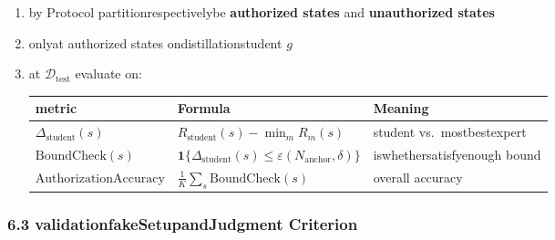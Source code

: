 \documentclass[
  12pt,
]{article}
\begin{document}
\begin{enumerate}
\def\labelenumi{\arabic{enumi}.}
\item
  by Protocol partitionrespectivelybe \textbf{authorized states} and \textbf{unauthorized
  states}
\item
  onlyat authorized states ondistillationstudent \(g\)
\item
  at \(\mathcal{D}_{\text{test}}\) evaluate on:

  \begin{longtable}[]{@{}
    >{\raggedright\arraybackslash}p{}
    >{\raggedright\arraybackslash}p{}
    >{\raggedright\arraybackslash}p{}@{}}
  \toprule\noalign{}
  \begin{minipage}[b]{\linewidth}\raggedright
  metric
  \end{minipage} & \begin{minipage}[b]{\linewidth}\raggedright
  Formula
  \end{minipage} & \begin{minipage}[b]{\linewidth}\raggedright
  Meaning
  \end{minipage} \\
  \midrule\noalign{}
  \endhead
  \bottomrule\noalign{}
  \endlastfoot
  \(\Delta_{\text{student}}(s)\) &
  \(R_{\text{student}}(s) - \min_m R_m(s)\) & student vs.~mostbestexpert \\
  \(\text{BoundCheck}(s)\) &
  \(\mathbf{1}\{\Delta_{\text{student}}(s) \le \varepsilon(N_{\text{anchor}}, \delta)\}\)
  & iswhethersatisfyenough bound \\
  \(\text{AuthorizationAccuracy}\) &
  \(\frac{1}{K} \sum_s \text{BoundCheck}(s)\) & overall accuracy \\
  \end{longtable}
\end{enumerate}

\subsubsection{6.3
validationfakeSetupandJudgment Criterion}\label{ux9a8cux8bc1ux5047ux8bbeux4e0eux5224ux5b9aux6807ux51c6}
\end{document}
